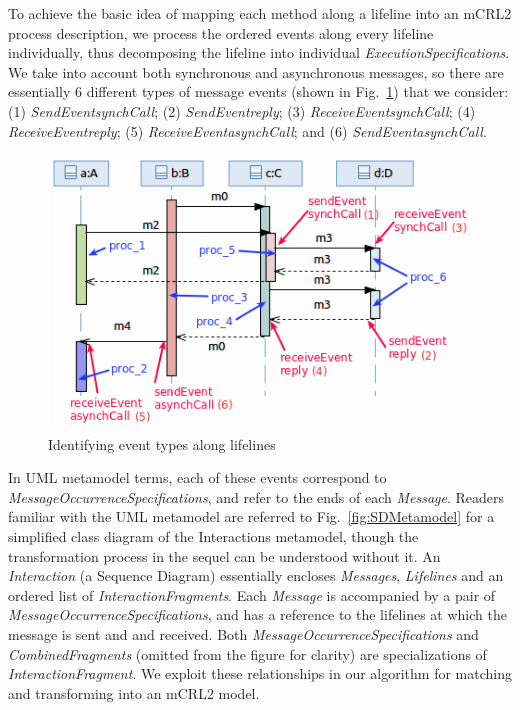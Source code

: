 \documentclass[letter]{llncs}
\newcommand{\figshrink}{\vspace{-.6cm}}
\newcommand{\figshrinkend}{}
\begin{document}
To achieve the basic idea of mapping each method along a lifeline into an mCRL2 process description, we process the ordered events along every
lifeline individually, thus decomposing the lifeline into individual \emph{ExecutionSpecifications}. 
We take into account both synchronous and asynchronous messages, 
so there are essentially 6 different types of message events (shown in Fig.~\ref{fig:exampleProcesses}) that we consider: 
(1) \emph{SendEvent}\textunderscore\emph{synchCall}; (2) \emph{SendEvent}\textunderscore\emph{reply}; (3) \emph{ReceiveEvent}\textunderscore\emph{synchCall}; 
(4) \emph{ReceiveEvent}\textunderscore\emph{reply};
(5) \emph{ReceiveEvent}\textunderscore\emph{asynchCall}; and (6) \emph{SendEvent}\textunderscore\emph{asynchCall}.
\begin{figure}[!t]
\centering
\figshrink
\includegraphics[width=0.65\linewidth,keepaspectratio=true]{./Figure6.png}
\caption{Identifying event types along lifelines}
\label{fig:exampleProcesses}
\figshrinkend
\vspace{.5cm}
\end{figure}
In UML metamodel terms, each of these events correspond to \emph{MessageOccurrenceSpecifications}, and refer to the ends of each \emph{Message}.
Readers familiar with the UML metamodel are referred to Fig.~\ref{fig:SDMetamodel}
for a simplified class diagram of the Interactions metamodel,
though the transformation process in the sequel can be understood
without it.
An \emph{Interaction} (a Sequence Diagram)
essentially encloses \emph{Messages}, \emph{Lifelines} and an ordered list of \emph{InteractionFragments}.
Each \emph{Message} is accompanied by a pair of \emph{MessageOccurrenceSpecifications}, and has a reference to
the lifelines at which the message is sent and and received. 
Both \emph{MessageOccurrenceSpecifications} and \emph{CombinedFragments} (omitted from the figure for clarity) 
are specializations of \emph{InteractionFragment}.
We exploit these relationships in our algorithm for matching and transforming into an mCRL2 model.
\end{document}
